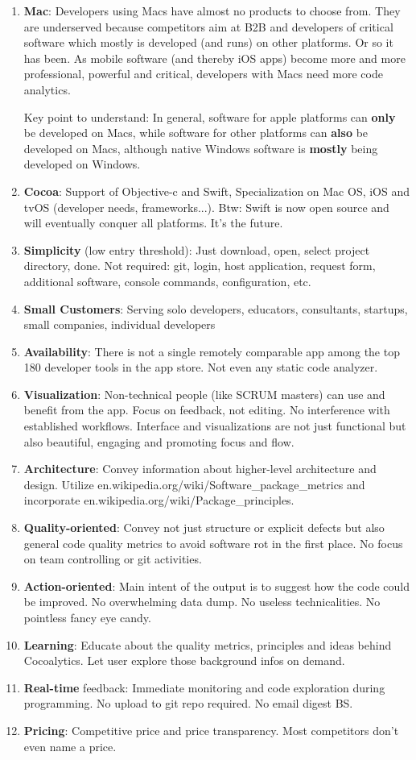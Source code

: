 \documentclass{article}
\begin{document}
\begin{enumerate}
	\item \textbf{Mac}: Developers using Macs have almost no products to choose from. They are underserved because competitors aim at B2B and developers of critical software which mostly is developed (and runs) on other platforms. Or so it has been. As mobile software (and thereby iOS apps) become more and more professional, powerful and critical, developers with Macs need more code analytics.

		Key point to understand: In general, software for apple platforms can \textbf{only} be developed on Macs, while software for other platforms can \textbf{also} be developed on Macs, although native Windows software is \textbf{mostly} being developed on Windows.
	\item \textbf{Cocoa}: Support of Objective-c and Swift, Specialization on Mac OS, iOS and tvOS (developer needs, frameworks...). Btw: Swift is now open source and will eventually conquer all platforms. It's the future.
	\item \textbf{Simplicity} (low entry threshold): Just download, open, select project directory, done. Not required: git, login, host application, request form, additional software, console commands, configuration, etc.
	\item \textbf{Small Customers}: Serving solo developers, educators, consultants, startups, small companies, individual developers
	\item \textbf{Availability}: There is not a single remotely comparable app among the top 180 developer tools in the app store. Not even any static code analyzer.
	\item \textbf{Visualization}: Non-technical people (like SCRUM masters) can use and benefit from the app. Focus on feedback, not editing. No interference with established workflows. Interface and visualizations are not just functional but also beautiful, engaging and promoting focus and flow.
	\item \textbf{Architecture}: Convey information about higher-level architecture and design. Utilize en.wikipedia.org/wiki/Software\_package\_metrics and incorporate en.wikipedia.org/wiki/Package\_principles.
	\item \textbf{Quality-oriented}: Convey not just structure or explicit defects but also general code quality metrics to avoid software rot in the first place. No focus on team controlling or git activities.
	\item \textbf{Action-oriented}: Main intent of the output is to suggest how the code could be improved. No overwhelming data dump. No useless technicalities. No pointless fancy eye candy.
	\item \textbf{Learning}: Educate about the quality metrics, principles and ideas behind Cocoalytics. Let user explore those background infos on demand.
	\item \textbf{Real-time} feedback: Immediate monitoring and code exploration during programming. No upload to git repo required. No email digest BS.
	\item \textbf{Pricing}: Competitive price and price transparency. Most competitors don't even name a price.
\end{enumerate}
\end{document}
